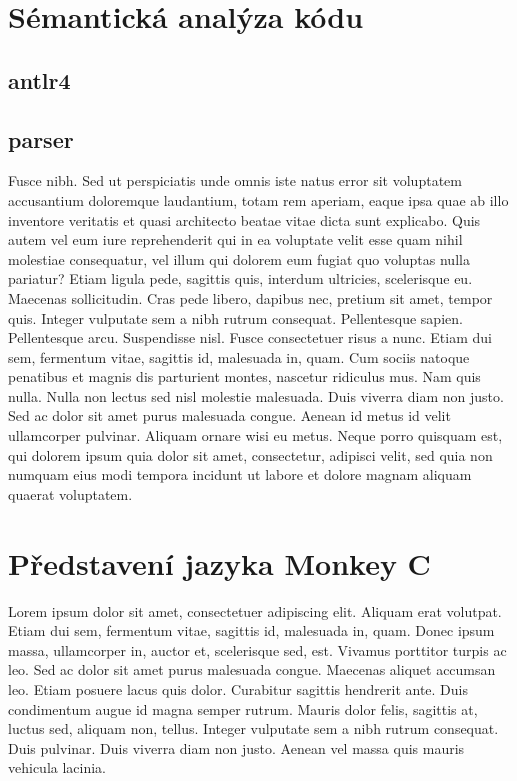 \documentclass[czech,master,dept460,male,cpp,cpdeclaration]{diploma}
\begin{document}
\section{Sémantická analýza kódu}
\subsection{antlr4}
\subsection{parser}
Fusce nibh. Sed ut perspiciatis unde omnis iste natus error sit voluptatem accusantium doloremque laudantium, totam rem aperiam, eaque ipsa quae ab illo inventore veritatis et quasi architecto beatae vitae dicta sunt explicabo. Quis autem vel eum iure reprehenderit qui in ea voluptate velit esse quam nihil molestiae consequatur, vel illum qui dolorem eum fugiat quo voluptas nulla pariatur? Etiam ligula pede, sagittis quis, interdum ultricies, scelerisque eu. Maecenas sollicitudin. Cras pede libero, dapibus nec, pretium sit amet, tempor quis. Integer vulputate sem a nibh rutrum consequat. Pellentesque sapien. Pellentesque arcu. Suspendisse nisl. Fusce consectetuer risus a nunc. Etiam dui sem, fermentum vitae, sagittis id, malesuada in, quam. Cum sociis natoque penatibus et magnis dis parturient montes, nascetur ridiculus mus. Nam quis nulla. Nulla non lectus sed nisl molestie malesuada. Duis viverra diam non justo. Sed ac dolor sit amet purus malesuada congue. Aenean id metus id velit ullamcorper pulvinar. Aliquam ornare wisi eu metus. Neque porro quisquam est, qui dolorem ipsum quia dolor sit amet, consectetur, adipisci velit, sed quia non numquam eius modi tempora incidunt ut labore et dolore magnam aliquam quaerat voluptatem.




\section{Představení jazyka Monkey C}
Lorem ipsum dolor sit amet, consectetuer adipiscing elit. Aliquam erat volutpat. Etiam dui sem, fermentum vitae, sagittis id, malesuada in, quam. Donec ipsum massa, ullamcorper in, auctor et, scelerisque sed, est. Vivamus porttitor turpis ac leo. Sed ac dolor sit amet purus malesuada congue. Maecenas aliquet accumsan leo. Etiam posuere lacus quis dolor. Curabitur sagittis hendrerit ante. Duis condimentum augue id magna semper rutrum. Mauris dolor felis, sagittis at, luctus sed, aliquam non, tellus. Integer vulputate sem a nibh rutrum consequat. Duis pulvinar. Duis viverra diam non justo. Aenean vel massa quis mauris vehicula lacinia.
\end{document}
